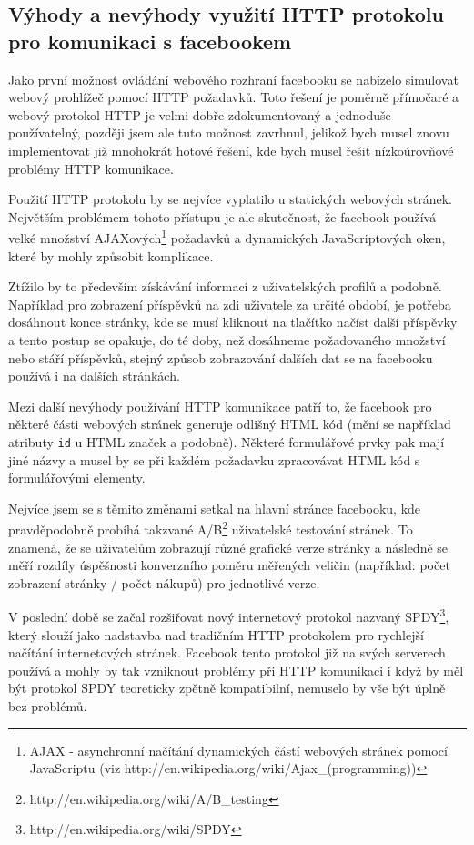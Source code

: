 \documentclass[thesis=M,czech]{FITthesis}[2013/05/10]
\begin{document}
\subsection{Výhody a nevýhody využití HTTP protokolu pro komunikaci s facebookem}

Jako první možnost ovládání webového rozhraní facebooku se nabízelo simulovat webový prohlížeč pomocí HTTP požadavků. Toto řešení je poměrně přímočaré a webový protokol HTTP je velmi dobře zdokumentovaný a jednoduše používatelný, později jsem ale tuto možnost zavrhnul, jelikož bych musel znovu implementovat již mnohokrát hotové řešení, kde bych musel řešit nízkoúrovňové problémy HTTP komunikace. 

Použití HTTP protokolu by se nejvíce vyplatilo u statických webových stránek. Největším problémem tohoto přístupu je ale skutečnost, že facebook používá velké množství AJAXových\footnote{AJAX - asynchronní načítání dynamických částí webových stránek pomocí JavaScriptu (viz http://en.wikipedia.org/wiki/Ajax\_(programming))} požadavků a dynamických JavaScriptových oken, které by mohly způsobit komplikace. 

Ztížilo by to především získávání informací z uživatelských profilů a podobně. Například pro zobrazení příspěvků na zdi uživatele za určité období, je potřeba dosáhnout konce stránky, kde se musí kliknout na tlačítko načíst další příspěvky a tento postup se opakuje, do té doby, než dosáhneme požadovaného množství nebo stáří příspěvků, stejný způsob zobrazování dalších dat se na facebooku používá i na dalších stránkách.

Mezi další nevýhody používání HTTP komunikace patří to, že facebook pro některé části webových stránek generuje odlišný HTML kód (mění se například atributy \verb|id| u HTML značek a podobně). Některé formulářové prvky pak mají jiné názvy a musel by se při každém požadavku zpracovávat HTML kód s formulářovými elementy. 

Nejvíce jsem se s těmito změnami setkal na hlavní stránce facebooku, kde pravděpodobně probíhá takzvané A/B\footnote{http://en.wikipedia.org/wiki/A/B\_testing} uživatelské testování stránek. To znamená, že se uživatelům zobrazují různé grafické verze stránky a následně se měří rozdíly úspěšnosti konverzního poměru měřených veličin (například: počet zobrazení stránky / počet nákupů) pro jednotlivé verze.

V poslední době se začal rozšiřovat nový internetový protokol nazvaný SPDY\footnote{http://en.wikipedia.org/wiki/SPDY}, který slouží jako nadstavba nad tradičním HTTP protokolem pro rychlejší načítání internetových stránek. Facebook tento protokol již na svých serverech používá a mohly by tak vzniknout problémy při HTTP komunikaci i když by měl být protokol SPDY teoreticky zpětně kompatibilní, nemuselo by vše být úplně bez problémů.
\end{document}
